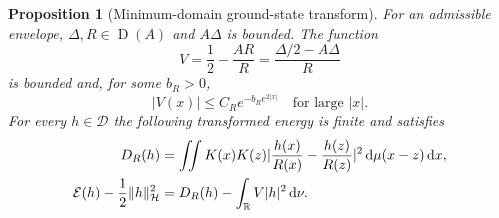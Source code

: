\documentclass[11pt,a4paper]{article}
\newcommand{\R}{\mathbb R}
\newcommand{\HH}{\mathcal H}
\newcommand{\DD}{\mathcal D}
\newcommand{\EE}{\mathcal E}
\newcommand{\norm}[1]{\lVert #1\rVert}
\newcommand{\abs}[1]{\lvert #1\rvert}
\newcommand{\dd}{\,\mathrm d}
\newcommand{\Dom}{\operatorname{D}}
\newtheorem{proposition}[theorem]{Proposition}
\theoremstyle{definition}
\theoremstyle{remark}
\numberwithin{equation}{section}
\begin{document}
\begin{proposition}[Minimum-domain ground-state transform]\label{prop:ground}
For an admissible envelope, $\Delta,R\in\Dom(A)$ and $A\Delta$ is
bounded. The function
\begin{equation}\label{eq:V}
 V=\frac12-\frac{AR}{R}=\frac{\Delta/2-A\Delta}{R}
\end{equation}
is bounded and, for some $b_R>0$,
\begin{equation}\label{eq:V-decay}
 \abs{V(x)}\le C_R e^{-b_Re^{2\abs x}}
 \quad\text{for large }\abs x.
\end{equation}
For every $h\in\DD$ the following transformed energy is finite and
satisfies
\begin{align}\label{eq:ground}
 D_R(h)&=\iint K(x)K(z)
       \abs{\frac{h(x)}{R(x)}-\frac{h(z)}{R(z)}}^2
                                  \dd\mu(x-z)\dd x,\notag\\
 \EE(h)-\frac12\norm h_{\HH}^2
       &=D_R(h)-\int_\R V\abs h^2\dd\nu.
\end{align}
\end{proposition}
\end{document}
